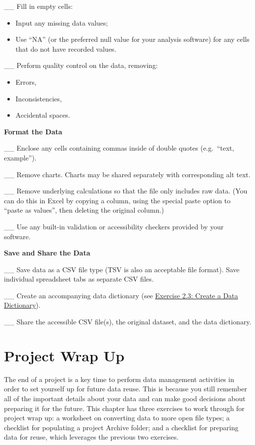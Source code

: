\documentclass[
]{book}
\providecommand{\tightlist}{%
  \setlength{\itemsep}{0pt}\setlength{\parskip}{0pt}}
\begin{document}
\_\_ Fill in empty cells:

\begin{itemize}
\tightlist
\item
  Input any missing data values;
\item
  Use ``NA'' (or the preferred null value for your analysis software) for any cells that do not have recorded values.
\end{itemize}

\_\_ Perform quality control on the data, removing:

\begin{itemize}
\tightlist
\item
  Errors,
\item
  Inconsistencies,
\item
  Accidental spaces.
\end{itemize}

\textbf{Format the Data}

\_\_ Enclose any cells containing commas inside of double quotes (e.g.~``text, example'').

\_\_ Remove charts. Charts may be shared separately with corresponding alt text.

\_\_ Remove underlying calculations so that the file only includes raw data. (You can do this in Excel by copying a column, using the special paste option to ``paste as values'', then deleting the original column.)

\_\_ Use any built-in validation or accessibility checkers provided by your software.

\textbf{Save and Share the Data}

\_\_ Save data as a CSV file type (TSV is also an acceptable file format). Save individual spreadsheet tabs as separate CSV files.

\_\_ Create an accompanying data dictionary (see \protect\hyperlink{data-dictionary}{Exercise 2.3: Create a Data Dictionary}).

\_\_ Share the accessible CSV file(s), the original dataset, and the data dictionary.

\hypertarget{project-wrap-up}{%
\chapter{Project Wrap Up}\label{project-wrap-up}}

The end of a project is a key time to perform data management activities in order to set yourself up for future data reuse. This is because you still remember all of the important details about your data and can make good decisions about preparing it for the future. This chapter has three exercises to work through for project wrap up: a worksheet on converting data to more open file types; a checklist for populating a project Archive folder; and a checklist for preparing data for reuse, which leverages the previous two exercises.
\end{document}
